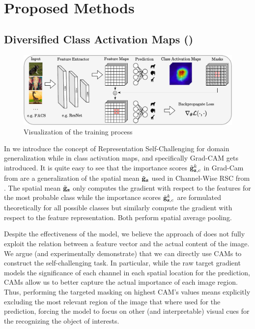\chapter{Proposed Methods}

\section{Diversified Class Activation Maps (\divcam)}
\label{sec:divcam}

\begin{figure}[t]
    \centering
    \includegraphics[width=\textwidth]{Figures/Chapter4/model_figure-cropped.pdf}
    \caption{Visualization of the \divcam training process}
    \label{fig:divcam-overview}
\end{figure}


In  we introduce the concept of Representation Self-Challenging for domain generalization while in  class activation maps, and specifically Grad-CAM gets introduced. It is quite easy to see that the importance scores $ \Tilde{\mathbf{g}}_{\mathbf{z},c}^k$ in Grad-Cam from  are a generalization of the spatial mean $\Tilde{\mathbf{g}}_\mathbf{z}$ used in Channel-Wise RSC from . The spatial mean $\Tilde{\mathbf{g}}_\mathbf{z}$ only computes the gradient with respect to the features for the most probable class while the importance scores $ \Tilde{\mathbf{g}}_{\mathbf{z},c}^k$ are formulated theoretically for all possible classes but similarly compute the gradient with respect to the feature representation. Both perform spatial average pooling.  

Despite the effectiveness of the model, we believe the approach of \citet{huang2020selfchallenging} does not fully exploit the relation between a feature vector and the actual content of the image. We argue (and experimentally demonstrate) that we can directly use CAMs to construct the self-challenging task. In particular, while the raw target gradient models the significance of each channel in each spatial location for the prediction, CAMs allow us to better capture the actual importance of each image region. Thus, performing the targeted masking on highest CAM's values means explicitly excluding the most relevant {region} of the image that where used for the prediction, forcing the model to focus on other (and interpretable) visual cues for the recognizing the object of interests. 

